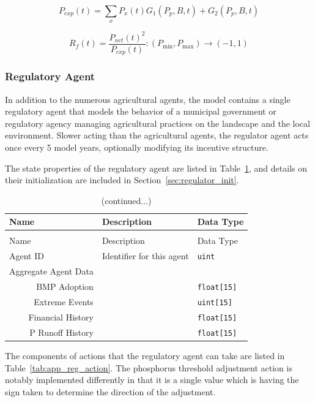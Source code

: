 \begin{equation}
\label{eq:expprofit}
    P_{exp}(t) = \sum_x P_x(t) G_1(P_p, B, t) + G_2(P_p, B, t)
\end{equation}

\begin{equation}
\label{eq:farmreward}
    R_f(t) = 
    \frac{P_{net}(t)^2}{P_{exp}(t)} 
    : \left(P_{\min}, P_{\max}\right) \rightarrow \left(-1, 1\right)
\end{equation}

\subsubsection{Regulatory Agent}

In addition to the numerous agricultural agents, the model contains 
a single regulatory agent that models 
the behavior of a municipal government or regulatory agency 
managing agricultural practices on the landscape and the local environment.
Slower acting than the agricultural agents, 
the regulator agent acts once every 5 model years, 
optionally modifying its incentive structure.

The state properties of the regulatory agent are listed in
Table~\ref{tab:app_reg_state},
and details on their initialization are included in
Section~\ref{sec:regulator_init}.

\begin{longtable}{lll}
\caption[Properties of Regulatory Agent]{Properties of Regulatory Agent}
\label{tab:app_reg_state} \\
\hline\hline
Name & Description & Data Type \\
\hline
\endfirsthead
\caption[]{(continued...)} \\
\hline\hline
Name & Description & Data Type \\
\hline
\endhead
\hline
\endfoot
Agent ID & Identifier for this agent & \tt{uint} \\
Aggregate Agent Data & & \\
\multicolumn{1}{r}{BMP Adoption} & & \tt{float[15]} \\
\multicolumn{1}{r}{Extreme Events} & & \tt{uint[15]} \\
\multicolumn{1}{r}{Financial History} & & \tt{float[15]} \\
\multicolumn{1}{r}{P Runoff History} & & \tt{float[15]} \\
\end{longtable}

The components of actions that the regulatory agent can take
are listed in Table~\ref{tab:app_reg_action}.
The phosphorus threshold adjustment action is notably implemented
differently in that it is a single value which is having the sign taken
to determine the direction of the adjustment.

